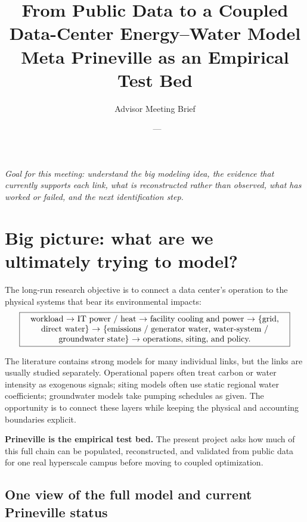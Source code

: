 \documentclass[11pt]{article}
\title{\textbf{From Public Data to a Coupled Data-Center Energy--Water Model}\\
\large Meta Prineville as an Empirical Test Bed}
\author{Advisor Meeting Brief}
\date{\BaselineName\ --- \BaselineCommit}
\begin{document}
\maketitle
\vspace{-0.9em}

\begin{center}
\small
\textit{Goal for this meeting: understand the big modeling idea, the evidence that currently supports each link, what is reconstructed rather than observed, what has worked or failed, and the next identification step.}
\end{center}

\section{Big picture: what are we ultimately trying to model?}

The long-run research objective is to connect a data center's operation to the physical systems that bear its environmental impacts:
\[
\boxed{\parbox{0.92\linewidth}{\centering
workload
\(\rightarrow\)
IT power / heat
\(\rightarrow\)
facility cooling and power
\(\rightarrow\)
\{grid, direct water\}
\(\rightarrow\)
\{emissions / generator water, water-system / groundwater state\}
\(\rightarrow\)
operations, siting, and policy.}}
\]

The literature contains strong models for many individual links, but the links are usually studied separately. Operational papers often treat carbon or water intensity as exogenous signals; siting models often use static regional water coefficients; groundwater models take pumping schedules as given. The opportunity is to connect these layers while keeping the physical and accounting boundaries explicit.

\textbf{Prineville is the empirical test bed.} The present project asks how much of this full chain can be populated, reconstructed, and validated from public data for one real hyperscale campus before moving to coupled optimization.

\subsection*{One view of the full model and current Prineville status}
\end{document}
